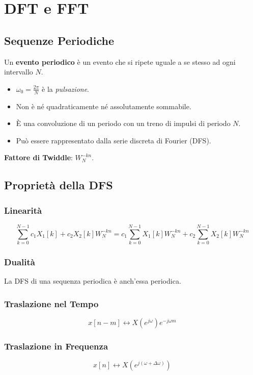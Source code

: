 \chapter{DFT e FFT}
\section*{Sequenze Periodiche}

Un \textbf{evento periodico} è un evento che si ripete uguale a se stesso ad ogni intervallo \( N \).

\begin{itemize}
    \item \(\omega_0 = \frac{2\pi}{N}\) è la \textit{pulsazione}.
    \item Non è né quadraticamente né assolutamente sommabile.
    \item È una convoluzione di un periodo con un treno di impulsi di periodo \( N \).
    \item Può essere rappresentato dalla serie discreta di Fourier (DFS).
\end{itemize}

\textbf{Fattore di Twiddle}: \( W_N^{-kn} \).

\section*{Proprietà della DFS}

\subsection*{Linearità}
\[
\sum_{k=0}^{N-1} c_1 X_1[k] + c_2 X_2[k] W_N^{-kn} = c_1 \sum_{k=0}^{N-1} X_1[k] W_N^{-kn} + c_2 \sum_{k=0}^{N-1} X_2[k] W_N^{-kn}
\]

\subsection*{Dualità}
La DFS di una sequenza periodica è anch'essa periodica.

\subsection*{Traslazione nel Tempo}
\[
x[n - m] \leftrightarrow X(e^{j\omega}) e^{-j\omega m}
\]

\subsection*{Traslazione in Frequenza}
\[
x[n] \leftrightarrow X(e^{j(\omega + \Delta \omega)}) 
\]

